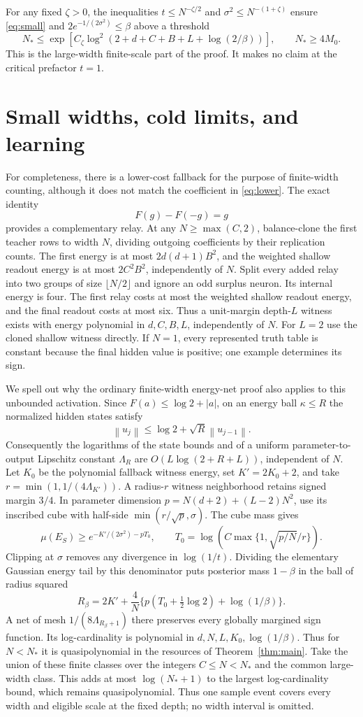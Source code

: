 \documentclass[11pt]{article}
\theoremstyle{remark}\newtheorem{remark}[theorem]{Remark}
\newcommand{\norm}[1]{\left\lVert #1\right\rVert}
\begin{document}
For any fixed $\zeta>0$, the inequalities $t\le N^{-\zeta/2}$ and
$\sigma^2\le N^{-(1+\zeta)}$ ensure \eqref{eq:small} and
$2e^{-1/(2\sigma^2)}\le\beta$ above a threshold
\[
 N_*\le\exp\!\left[C_\zeta
   \log^2(2+d+C+B+L+\log(2/\beta))\right],\qquad N_*\ge4M_0.
\]
This is the large-width finite-scale part of the proof. It makes no
claim at the critical prefactor $t=1$.

\section{Small widths, cold limits, and learning}

For completeness, there is a lower-cost fallback for the purpose of
finite-width counting, although it does not match the coefficient in
\eqref{eq:lower}. The exact identity
\[
 F(g)-F(-g)=g
\]
provides a complementary relay. At any $N\ge\max(C,2)$, balance-clone
the first teacher rows to width $N$, dividing outgoing coefficients by
their replication counts. The first energy is at most
$2d(d+1)B^2$, and the weighted shallow readout energy is at most
$2C^2B^2$, independently of $N$. Split every added relay into two groups
of size $\lfloor N/2\rfloor$ and ignore an odd surplus neuron. Its
internal energy is four. The first relay costs at most the weighted
shallow readout energy, and the final readout costs at most six.
Thus a unit-margin depth-$L$ witness exists with energy polynomial in
$d,C,B,L$, independently of $N$. For $L=2$ use the cloned shallow witness
directly. If $N=1$, every represented truth table is constant because
the final hidden value is positive; one example determines its sign.

We spell out why the ordinary finite-width energy-net proof also applies
to this unbounded activation. Since $F(a)\le\log2+|a|$, on an energy
ball $\kappa\le R$ the normalized hidden states satisfy
\[
 \norm{u_j}\le\log2+\sqrt R\norm{u_{j-1}}.
\]
Consequently the logarithms of the state bounds and of a uniform
parameter-to-output Lipschitz constant $\Lambda_R$ are
$O(L\log(2+R+L))$, independent of $N$.
Let $K_0$ be the polynomial fallback witness energy, set $K'=2K_0+2$,
and take $r=\min(1,1/(4\Lambda_{K'}))$. A radius-$r$ witness neighborhood
retains signed margin $3/4$. In parameter dimension
$p=N(d+2)+(L-2)N^2$, use its inscribed cube with half-side
$\min(r/\sqrt p,\sigma)$. The cube mass gives
\[
 \mu(E_S)\ge e^{-K'/(2\sigma^2)-pT_0},\qquad
 T_0=\log\!\left(C\max\{1,\sqrt{p/N}/r\}\right).
\]
Clipping at $\sigma$ removes any divergence in $\log(1/t)$.
Dividing the elementary Gaussian energy tail by this denominator puts
posterior mass $1-\beta$ in the ball of radius squared
\[
 R_\beta=2K'+\frac4N
       \{p(T_0+\tfrac12\log2)+\log(1/\beta)\}.
\]
A net of mesh $1/(8\Lambda_{R_\beta+1})$ there preserves every globally
margined sign function. Its log-cardinality is polynomial in
$d,N,L,K_0,\log(1/\beta)$. Thus for $N<N_*$ it is quasipolynomial in
the resources of Theorem~\ref{thm:main}. Take the union of these finite
classes over the integers $C\le N<N_*$ and the common large-width class.
This adds at most $\log(N_*+1)$ to the largest log-cardinality bound,
which remains quasipolynomial. Thus one sample event covers every width
and eligible scale at the fixed depth; no width interval is omitted.
\end{document}
